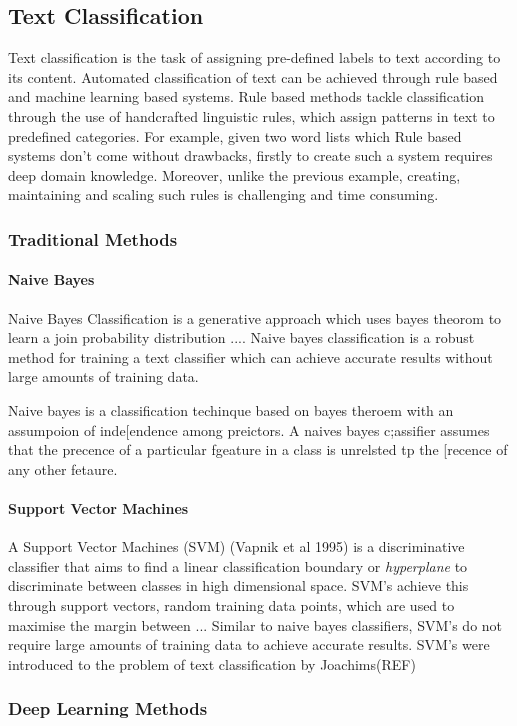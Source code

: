 \subsection{Text Classification}
Text classification is the task of assigning pre-defined labels to text according to its content. Automated classification of text can be achieved through rule based and machine learning based systems. Rule based methods tackle classification through the use of handcrafted linguistic rules, which assign patterns in text to predefined categories. For example, given two word lists which  Rule based systems don't come without drawbacks, firstly to create such a system requires deep domain knowledge. Moreover, unlike the previous example, creating, maintaining and scaling such rules is challenging and time consuming. 
\subsubsection{Traditional Methods}
\paragraph{Naive Bayes} 
Naive Bayes Classification is a generative approach which uses bayes theorom to learn a join probability distribution .... Naive bayes classification is a robust method for training a text classifier which can achieve accurate results without large amounts of training data.

Naive bayes is a classification techinque based on bayes theroem with an assumpoion of inde[endence among preictors. A naives bayes c;assifier assumes that the precence of a particular fgeature in a class is unrelsted tp the [recence of any other fetaure.

\paragraph{Support Vector Machines}
A Support Vector Machines (SVM) (Vapnik et al 1995) is a discriminative classifier that aims to find a linear classification boundary or \textit{hyperplane} to discriminate between classes in high dimensional space. SVM's achieve this through support vectors, random training data points, which are used to maximise the margin between ... Similar to naive bayes classifiers, SVM's do not require large amounts of training data to achieve accurate results. SVM's were introduced to the problem of text classification by Joachims(REF)

\subsubsection{Deep Learning Methods}